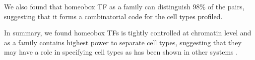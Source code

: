 We also found that homeobox TF as a family can distinguish 98\% of the pairs, suggesting that it forms a combinatorial code for the cell types profiled. 

In summary, we found homeobox TFs is tightly controlled at chromatin level and as a family contains highest power to separate cell types, suggesting that they may have a role in specifying cell types as has been shown in other systems \cite{Kratsios_2017,Zheng_2015,Dasen_2009,Philippidou_2013}.





